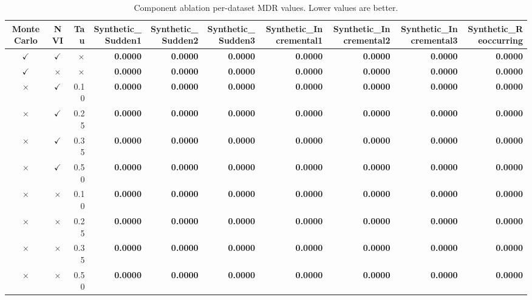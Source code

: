 \begin{table}
\caption{Component ablation per-dataset MDR values. Lower values are better.}
\label{tab:per-data-component-ablation-missed-detection-rate}
\begin{tabular}{ccrrrrrrrr}
\toprule
Monte Carlo & NVI & Tau & Synthetic\_Sudden1 & Synthetic\_Sudden2 & Synthetic\_Sudden3 & Synthetic\_Incremental1 & Synthetic\_Incremental2 & Synthetic\_Incremental3 & Synthetic\_Reoccurring \\
\midrule
$\checkmark$ & $\checkmark$ & $\times$ & \textbf{0.0000} & \textbf{0.0000} & \textbf{0.0000} & \textbf{0.0000} & \textbf{0.0000} & \textbf{0.0000} & \textbf{0.0000} \\
$\checkmark$ & $\times$ & $\times$ & \textbf{0.0000} & \textbf{0.0000} & \textbf{0.0000} & \textbf{0.0000} & \textbf{0.0000} & \textbf{0.0000} & \textbf{0.0000} \\
$\times$ & $\checkmark$ & 0.10 & \textbf{0.0000} & \textbf{0.0000} & \textbf{0.0000} & \textbf{0.0000} & \textbf{0.0000} & \textbf{0.0000} & \textbf{0.0000} \\
$\times$ & $\checkmark$ & 0.25 & \textbf{0.0000} & \textbf{0.0000} & \textbf{0.0000} & \textbf{0.0000} & \textbf{0.0000} & \textbf{0.0000} & \textbf{0.0000} \\
$\times$ & $\checkmark$ & 0.35 & \textbf{0.0000} & \textbf{0.0000} & \textbf{0.0000} & \textbf{0.0000} & \textbf{0.0000} & \textbf{0.0000} & \textbf{0.0000} \\
$\times$ & $\checkmark$ & 0.50 & \textbf{0.0000} & \textbf{0.0000} & \textbf{0.0000} & \textbf{0.0000} & \textbf{0.0000} & \textbf{0.0000} & \textbf{0.0000} \\
$\times$ & $\times$ & 0.10 & \textbf{0.0000} & \textbf{0.0000} & \textbf{0.0000} & \textbf{0.0000} & \textbf{0.0000} & \textbf{0.0000} & \textbf{0.0000} \\
$\times$ & $\times$ & 0.25 & \textbf{0.0000} & \textbf{0.0000} & \textbf{0.0000} & \textbf{0.0000} & \textbf{0.0000} & \textbf{0.0000} & \textbf{0.0000} \\
$\times$ & $\times$ & 0.35 & \textbf{0.0000} & \textbf{0.0000} & \textbf{0.0000} & \textbf{0.0000} & \textbf{0.0000} & \textbf{0.0000} & \textbf{0.0000} \\
$\times$ & $\times$ & 0.50 & \textbf{0.0000} & \textbf{0.0000} & \textbf{0.0000} & \textbf{0.0000} & \textbf{0.0000} & \textbf{0.0000} & \textbf{0.0000} \\
\bottomrule
\end{tabular}
\end{table}
